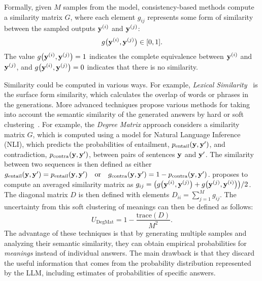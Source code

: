   Formally, given $M$ samples from the model, consistency-based methods compute a similarity matrix \(G\), where each element \(g_{ij}\) represents some form of similarity between the sampled outputs \(\mathbf{y}^{(i)}\) and \(\mathbf{y}^{(j)}\): 
  \begin{equation}
    g\bigl(\mathbf{y}^{(i)}, \mathbf{y}^{(j)}\bigr) \in [0, 1].
  \end{equation}
  The value \(g\bigl(\mathbf{y}^{(i)}, \mathbf{y}^{(j)}\bigr) = 1\) indicates the complete equivalence between \(\mathbf{y}^{(i)}\) and \(\mathbf{y}^{(j)}\), and \(g\bigl(\mathbf{y}^{(i)}, \mathbf{y}^{(j)}\bigr) = 0\) indicates that there is no similarity. 
  
  Similarity could be computed in various ways. For example, {\it Lexical Similarity}~\citep{fomicheva-etal-2020-unsupervised} is the surface form similarity, which calculates the overlap of words or phrases in the generations. More advanced techniques propose various methods for taking into account the semantic similarity of the generated answers by hard or soft clustering~\citep{lin2023generating}. For example, the \textit{Degree Matrix} approach considers a similarity matrix $G$, which is computed using a model for Natural Language Inference (NLI), which predicts the probabilities of entailment, ${p}_{\mathrm{entail}}(\mathbf{y}, \mathbf{y}')$, and contradiction, ${p}_{\mathrm{contra}}(\mathbf{y}, \mathbf{y}')$, between pairs of sentences $\mathbf{y}$ and $\mathbf{y}'$. The similarity between two sequences is then defined as either $g_{\mathrm{entail}}(\mathbf{y}, \mathbf{y}') = {p}_{\mathrm{entail}}(\mathbf{y}, \mathbf{y}') \quad \text{or} \quad g_{\mathrm{contra}}(\mathbf{y}, \mathbf{y}') = 1 - {p}_{\mathrm{contra}}(\mathbf{y}, \mathbf{y}')$. \citet{lin2023generating} proposes to compute an averaged similarity matrix as  $g_{ij} = \bigl(g\bigl(\mathbf{y}^{(i)}, \mathbf{y}^{(j)}\bigr) + g\bigl(\mathbf{y}^{(j)}, \mathbf{y}^{(i)}\bigr)\bigr)/2$. The diagonal matrix $D$ is then defined with elements  $D_{ii} = \sum_{j = 1}^M g_{ij}$. The uncertainty from this soft clustering of meanings can then be defined as follows:
  \begin{equation}
    U_{\mathrm{DegMat}} = 1 - \frac{\mathrm{trace}(D)}{M^2}. 
  \end{equation}
  The advantage of these techniques is that by generating multiple samples and analyzing their semantic similarity, they can obtain empirical probabilities for \textit{meanings} instead of individual answers. The main drawback is that they discard the useful information that comes from the probability distribution represented by the LLM, including estimates of probabilities of specific answers. 


